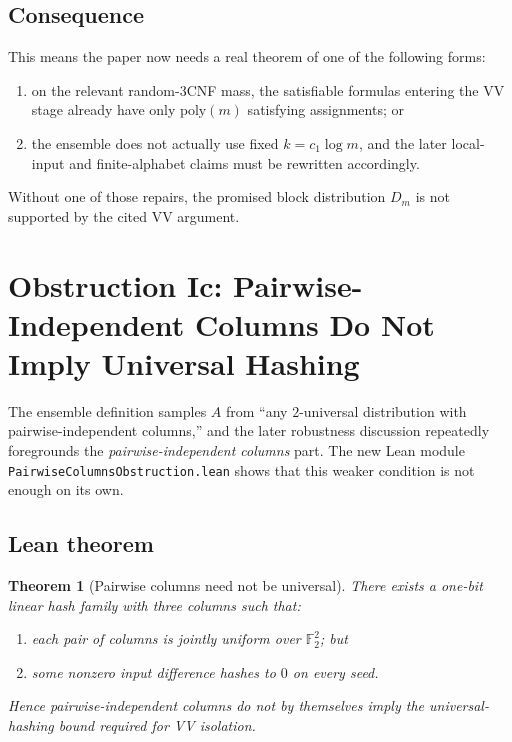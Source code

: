 \documentclass[11pt]{article}
\newtheorem{theorem}{Theorem}[section]
\theoremstyle{remark}
\begin{document}
\subsection{Consequence}

This means the paper now needs a real theorem of one of the following forms:
\begin{enumerate}[leftmargin=1.5em]
  \item on the relevant random-3CNF mass, the satisfiable formulas entering the VV stage already
  have only \(\mathrm{poly}(m)\) satisfying assignments; or
  \item the ensemble does not actually use fixed \(k=c_1\log m\), and the later local-input and
  finite-alphabet claims must be rewritten accordingly.
\end{enumerate}

Without one of those repairs, the promised block distribution \(D_m\) is not supported by the
cited VV argument.

\section{Obstruction Ic: Pairwise-Independent Columns Do Not Imply Universal Hashing}

The ensemble definition samples \(A\) from ``any \(2\)-universal distribution with
pairwise-independent columns,'' and the later robustness discussion repeatedly foregrounds the
\emph{pairwise-independent columns} part.  The new Lean module
\texttt{PairwiseColumnsObstruction.lean} shows that this weaker condition is not enough on its own.

\subsection{Lean theorem}

\begin{theorem}[Pairwise columns need not be universal]
There exists a one-bit linear hash family with three columns such that:
\begin{enumerate}[leftmargin=1.5em]
  \item each pair of columns is jointly uniform over \(\mathbb{F}_2^2\); but
  \item some nonzero input difference hashes to \(0\) on \emph{every} seed.
\end{enumerate}
Hence pairwise-independent columns do not by themselves imply the universal-hashing bound required
for VV isolation.
\end{theorem}
\end{document}
